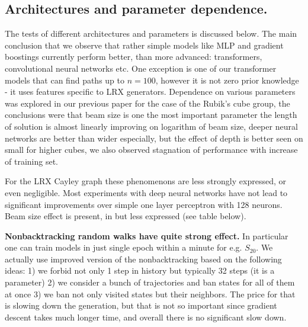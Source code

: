 \documentclass[atmp]{ipart_v1}
\numberwithin{equation}{section}
\theoremstyle{plain}%
\begin{document}
\subsection{Architectures and parameter dependence. }
The tests of different architectures and parameters is discussed below.
The main conclusion that we observe that rather simple models like MLP and gradient boostings currently perform better, than more advanced: transformers, convolutional neural networks etc. One exception is one of our transformer models that can find paths up to $n=100$, however it is not zero prior knowledge - it uses features specific to LRX generators. Dependence on various parameters  was explored in our previous paper \cite{chervov2025machinelearningapproachbeats} for the case of the Rubik's cube group, the conclusions were that beam size is one the most important parameter the length of solution is almost linearly improving on logarithm of beam size, deeper neural networks are better than wider especially, but the effect of depth is better seen on small for higher cubes, we also observed stagnation of performance with increase of training set.  

For the LRX Cayley graph these phenomenons are less strongly expressed, or even negligible. 
Most experiments with deep neural networks have not lead to significant improvements over simple one layer perceptron with 128 neurons. Beam size effect is present, in but less expressed (see table below). 

{\bf Nonbacktracking random walks have quite strong effect.} In particular one can train models in just single epoch within a minute for e.g. $S_{20}$. We actually use improved version of the nonbacktracking based on the following ideas: 1) we forbid not only 1 step in history but typically 32 steps (it is a parameter) 2) we consider a bunch of trajectories and ban states for all of them at once 3) we ban not only visited states but their neighbors. The price for that is slowing down the generation, but that is not so important since gradient descent takes much longer time, and overall there is no significant slow down. 
\end{document}
